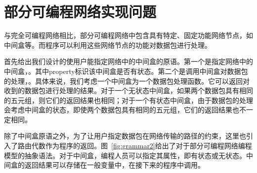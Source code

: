 \section{部分可编程网络实现问题}

与完全可编程网络相比，部分可编程网络中包含具有特定、固定功能网络节点，如中间盒等。而程序可以利用这些网络节点的功能对数据包进行处理。

首先给出我们设计的使用户能指定网络中的中间盒的原语。第一个是指定网络中的中间盒，。其中property标识该中间盒是否有状态。第二个是调用中间盒对数据包的处理，。具体来说，我们考虑一个中间盒为一个数据包处理函数。它可以返回对收到的数据包进行处理的结果。对于一个无状态中间盒，如果两个数据包具有相同的五元组，则它们的返回结果也相同；对于一个有状态中间盒，由于数据包的处理会考虑中间盒的状态，即使两个数据包具有相同的五元组，它们的返回结果也不一定相同。

除了中间盒原语之外，为了让用户指定数据包在网络传输的路径的约束，这里也引入了路由代数作为程序的返回。图~\ref{fig:grammar2}给出了对于部分可编程网络编程模型的抽象语法。对于中间盒，编程人员可以指定其属性，即有状态或无状态。中间盒的返回结果可以存储在一般变量中，在接下来的程序中调用。

